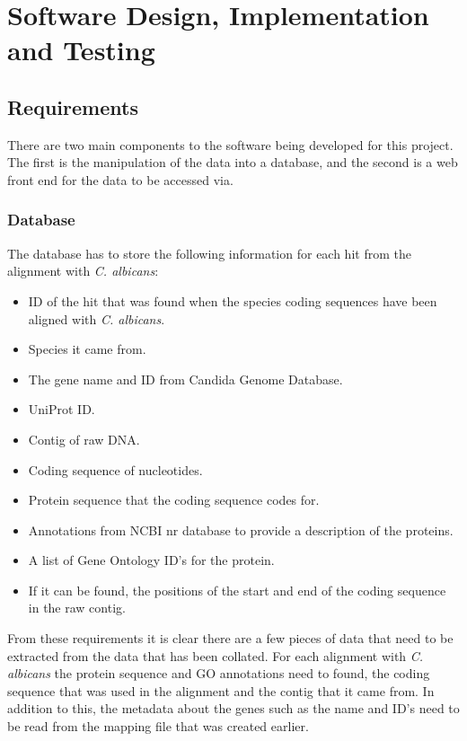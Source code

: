 \chapter{Software Design, Implementation and Testing}

\section{Requirements}
There are two main components to the software being developed for this project. The first is the manipulation of the data into a database, and the second is a web front end for the data to be accessed via. 

\subsection{Database}
The database has to store the following information for each hit from the alignment with \textit{C. albicans}:

\begin{itemize}
  \item ID of the hit that was found when the species coding sequences have been aligned with \textit{C. albicans}.
  \item Species it came from.
  \item The gene name and ID from Candida Genome Database.
  \item UniProt ID.
  \item Contig of raw DNA.
  \item Coding sequence of nucleotides.
  \item Protein sequence that the coding sequence codes for.
  \item Annotations from NCBI nr database to provide a description of the proteins.
  \item A list of Gene Ontology\cite{geneontology} ID's for the protein.
  \item If it can be found, the positions of the start and end of the coding sequence in the raw contig. 
\end{itemize}

From these requirements it is clear there are a few pieces of data that need to be extracted from the data that has been collated. For each alignment with \textit{C. albicans} the protein sequence and GO annotations need to found, the coding sequence that was used in the alignment and the contig that it came from. In addition to this, the metadata about the genes such as the name and ID's need to be read from the mapping file that was created earlier. 


